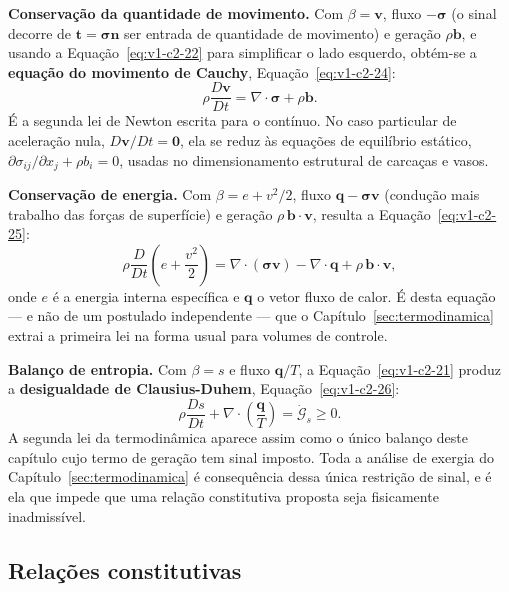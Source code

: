 \documentclass[12pt,a4paper]{article}
\numberwithin{equation}{section}
\numberwithin{table}{section}
\numberwithin{figure}{section}
\begin{document}
\textbf{Conservação da quantidade de movimento.} Com $\beta = \mathbf{v}$,
fluxo $-\boldsymbol{\sigma}$ (o sinal decorre de $\mathbf{t}=\boldsymbol\sigma
\mathbf{n}$ ser entrada de quantidade de movimento) e geração $\rho\mathbf{b}$,
e usando a Equação~\eqref{eq:v1-c2-22} para simplificar o lado esquerdo,
obtém-se a \textbf{equação do movimento de Cauchy},
Equação~\eqref{eq:v1-c2-24}:
\begin{equation}\label{eq:v1-c2-24}
\rho \frac{D\mathbf{v}}{Dt} = \nabla \cdot \boldsymbol{\sigma} + \rho \mathbf{b}.
\end{equation}
É a segunda lei de Newton escrita para o contínuo. No caso particular de
aceleração nula, $D\mathbf{v}/Dt = \mathbf{0}$, ela se reduz às equações de
equilíbrio estático, $\partial\sigma_{ij}/\partial x_j + \rho b_i = 0$, usadas
no dimensionamento estrutural de carcaças e vasos.

\textbf{Conservação de energia.} Com $\beta = e + v^2/2$, fluxo
$\mathbf{q} - \boldsymbol{\sigma}\mathbf{v}$ (condução mais trabalho das forças
de superfície) e geração $\rho\,\mathbf{b}\cdot\mathbf{v}$, resulta a
Equação~\eqref{eq:v1-c2-25}:
\begin{equation}\label{eq:v1-c2-25}
\rho \frac{D}{Dt}\left( e + \frac{v^2}{2} \right) =
\nabla \cdot (\boldsymbol{\sigma}\mathbf{v}) - \nabla \cdot \mathbf{q} +
\rho\, \mathbf{b}\cdot\mathbf{v},
\end{equation}
onde $e$ é a energia interna específica e $\mathbf{q}$ o vetor fluxo de calor.
É desta equação --- e não de um postulado independente --- que o
Capítulo~\ref{sec:termodinamica} extrai a primeira lei na forma usual para
volumes de controle.

\textbf{Balanço de entropia.} Com $\beta = s$ e fluxo $\mathbf{q}/T$, a
Equação~\eqref{eq:v1-c2-21} produz a \textbf{desigualdade de Clausius-Duhem},
Equação~\eqref{eq:v1-c2-26}:
\begin{equation}\label{eq:v1-c2-26}
\rho \frac{Ds}{Dt} + \nabla\cdot\!\left(\frac{\mathbf{q}}{T}\right)
= \dot{\mathcal{G}}_s \ge 0 .
\end{equation}
A segunda lei da termodinâmica aparece assim como o único balanço deste
capítulo cujo termo de geração tem sinal imposto. Toda a análise de exergia do
Capítulo~\ref{sec:termodinamica} é consequência dessa única restrição de sinal,
e é ela que impede que uma relação constitutiva proposta seja fisicamente
inadmissível.

\subsection{Relações constitutivas}\label{sub:v1-c2-constitutivas}
\end{document}
